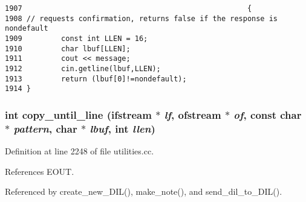 \footnotesize\begin{verbatim}1907                                                    {
1908 // requests confirmation, returns false if the response is nondefault
1909         const int LLEN = 16;
1910         char lbuf[LLEN];
1911         cout << message;
1912         cin.getline(lbuf,LLEN);
1913         return (lbuf[0]!=nondefault);
1914 }
\end{verbatim}\normalsize 
{}
\subsubsection{\setlength{\rightskip}{0pt plus 5cm}int copy\_\-until\_\-line (ifstream $\ast$ {\em lf}, ofstream $\ast$ {\em of}, const char $\ast$ {\em pattern}, char $\ast$ {\em lbuf}, int {\em llen})}\label{utilities_8cc_a47}




Definition at line 2248 of file utilities.cc.

References EOUT.

Referenced by create\_\-new\_\-DIL(), make\_\-note(), and send\_\-dil\_\-to\_\-DIL().



